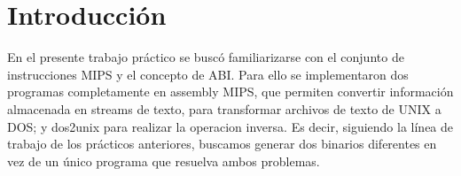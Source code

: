 \documentclass[a4paper,10pt]{article}
\begin{document}

\setcounter{page}{2}

\newpage
\thispagestyle{empty}
\tableofcontents

\newpage
\section{Introducci\'on}
   En el presente trabajo pr\'actico se busc\'o  familiarizarse con el conjunto de instrucciones MIPS y el concepto de ABI. Para ello se implementaron dos programas completamente en assembly MIPS, que permiten convertir informaci\'on almacenada en streams de texto, para transformar archivos de texto de UNIX a DOS; y dos2unix para realizar la operacion inversa. Es decir, siguiendo la l\'inea de trabajo de los pr\'acticos anteriores, buscamos generar dos binarios diferentes en vez de un \'unico programa que resuelva ambos problemas.
\end{document}
